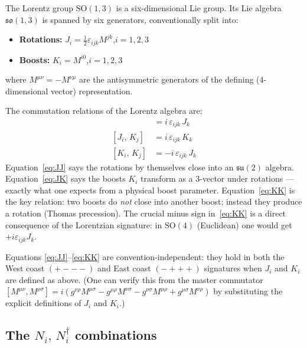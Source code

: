 The Lorentz group $\mathrm{SO}(1,3)$ is a six-dimensional Lie group.
Its Lie algebra $\mathfrak{so}(1,3)$ is spanned by six generators,
conventionally split into:
\begin{itemize}
  \item \textbf{Rotations:} $J_i = \tfrac{1}{2}\varepsilon_{ijk}M^{jk}$,\quad $i=1,2,3$
  \item \textbf{Boosts:} $K_i = M^{i0}$,\quad $i=1,2,3$
\end{itemize}
where $M^{\mu\nu} = -M^{\nu\mu}$ are the antisymmetric generators of the
defining (4-dimensional vector) representation.

The commutation relations of the Lorentz algebra are:
\begin{align}
  [J_i,\, J_j] &= i\,\varepsilon_{ijk}\,J_k
  \label{eq:JJ}\\
  [J_i,\, K_j] &= i\,\varepsilon_{ijk}\,K_k
  \label{eq:JK}\\
  [K_i,\, K_j] &= -i\,\varepsilon_{ijk}\,J_k
  \label{eq:KK}
\end{align}
Equation~\eqref{eq:JJ} says the rotations by themselves close into an
$\mathfrak{su}(2)$ algebra.
Equation~\eqref{eq:JK} says the boosts $K_i$ transform as a 3-vector under
rotations --- exactly what one expects from a physical boost parameter.
Equation~\eqref{eq:KK} is the key relation: two boosts do \emph{not} close
into another boost; instead they produce a rotation (Thomas precession).
The crucial minus sign in~\eqref{eq:KK} is a direct consequence of the
Lorentzian signature: in $\mathrm{SO}(4)$ (Euclidean) one would get $+i\varepsilon_{ijk}J_k$.

\begin{remark}
  Equations \eqref{eq:JJ}--\eqref{eq:KK} are convention-independent:
  they hold in both the West coast $(+{-}{-}{-})$ and East coast
  $(-{+}{+}{+})$ signatures when $J_i$ and $K_i$ are defined as above.
  (One can verify this from the master commutator
  $[M^{\mu\nu},M^{\rho\sigma}] = i(g^{\nu\rho}M^{\mu\sigma}
  - g^{\mu\rho}M^{\nu\sigma} - g^{\nu\sigma}M^{\mu\rho}
  + g^{\mu\sigma}M^{\nu\rho})$
  by substituting the explicit definitions of $J_i$ and $K_i$.)
\end{remark}

\subsection{The \texorpdfstring{$N_i,\,N_i^\dagger$}{N, N†} combinations}

